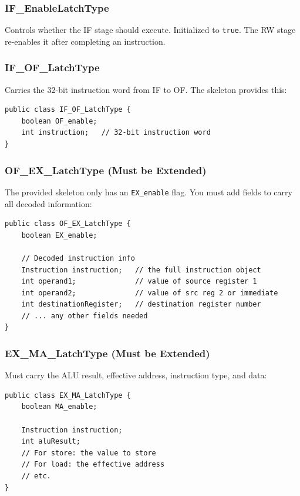\documentclass[12pt,a4paper]{article}
\begin{document}
\subsubsection{IF\_EnableLatchType}

Controls whether the IF stage should execute. Initialized to \texttt{true}. The RW stage re-enables it after completing an instruction.

\subsubsection{IF\_OF\_LatchType}

Carries the 32-bit instruction word from IF to OF. The skeleton provides this:

\begin{lstlisting}[style=javastyle]
public class IF_OF_LatchType {
    boolean OF_enable;
    int instruction;   // 32-bit instruction word
}
\end{lstlisting}

\subsubsection{OF\_EX\_LatchType (Must be Extended)}

The provided skeleton only has an \texttt{EX\_enable} flag. You must add fields to carry all decoded information:

\begin{lstlisting}[style=javastyle, caption={Suggested OF\_EX\_LatchType fields}]
public class OF_EX_LatchType {
    boolean EX_enable;

    // Decoded instruction info
    Instruction instruction;   // the full instruction object
    int operand1;              // value of source register 1
    int operand2;              // value of src reg 2 or immediate
    int destinationRegister;   // destination register number
    // ... any other fields needed
}
\end{lstlisting}

\subsubsection{EX\_MA\_LatchType (Must be Extended)}

Must carry the ALU result, effective address, instruction type, and data:

\begin{lstlisting}[style=javastyle, caption={Suggested EX\_MA\_LatchType fields}]
public class EX_MA_LatchType {
    boolean MA_enable;

    Instruction instruction;
    int aluResult;
    // For store: the value to store
    // For load: the effective address
    // etc.
}
\end{lstlisting}
\end{document}
